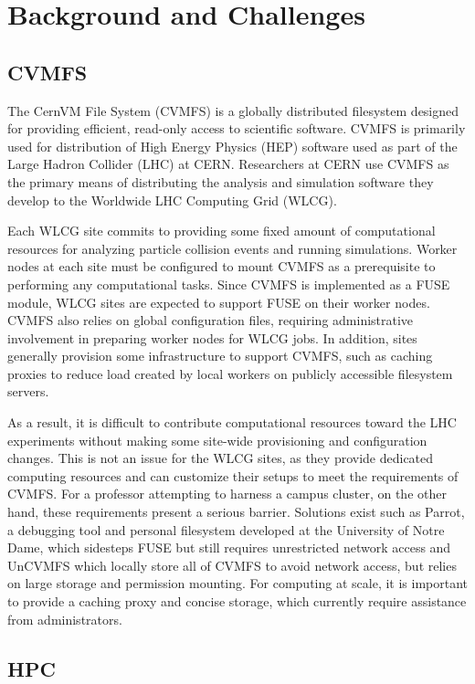 \documentclass[sigconf]{acmart}
\begin{document}
\section{Background and Challenges}

\subsection{CVMFS}
The CernVM File System (CVMFS) is a globally distributed filesystem designed for providing efficient,
read-only access to scientific software.
CVMFS is primarily used for distribution of High Energy Physics (HEP) software used as part of the Large Hadron Collider (LHC) at CERN.
Researchers at CERN use CVMFS as the primary means of distributing the analysis and simulation software they develop to the Worldwide LHC Computing Grid (WLCG).

Each WLCG site commits to providing some fixed amount of computational resources for analyzing particle collision events and running simulations.
Worker nodes at each site must be configured to mount CVMFS as a prerequisite to performing any computational tasks.
Since CVMFS is implemented as a FUSE module,
WLCG sites are expected to support FUSE on their worker nodes.
CVMFS also relies on global configuration files,
requiring administrative involvement in preparing worker nodes for WLCG jobs.
In addition, sites generally provision some infrastructure to support CVMFS,
such as caching proxies to reduce load created by local workers on publicly accessible filesystem servers.

As a result, it is difficult to contribute computational resources toward the LHC experiments without making some site-wide provisioning and configuration changes.
This is not an issue for the WLCG sites,
as they provide dedicated computing resources and can customize their setups to meet the requirements of CVMFS.
For a professor attempting to harness a campus cluster,
on the other hand, these requirements present a serious barrier.
Solutions exist such as
Parrot, a debugging tool and personal filesystem developed at the University of Notre Dame,
which sidesteps FUSE but still requires unrestricted network access and
UnCVMFS which locally store all of CVMFS to avoid network access, 
but relies on large storage and permission mounting.
For computing at scale, it is important to provide a caching proxy and concise storage,
which currently require assistance from administrators.

\subsection{HPC}
\end{document}
